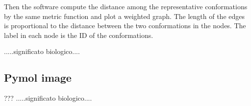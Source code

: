 Then the software compute the distance among the representative conformations by the same metric function and plot a weighted graph.
The length of the edges is proportional to the distance between the two conformations in the nodes. The label in each node is the ID of the conformations.



.....significato biologico.... 


\subsection{Pymol image}
???
.....significato biologico.... 